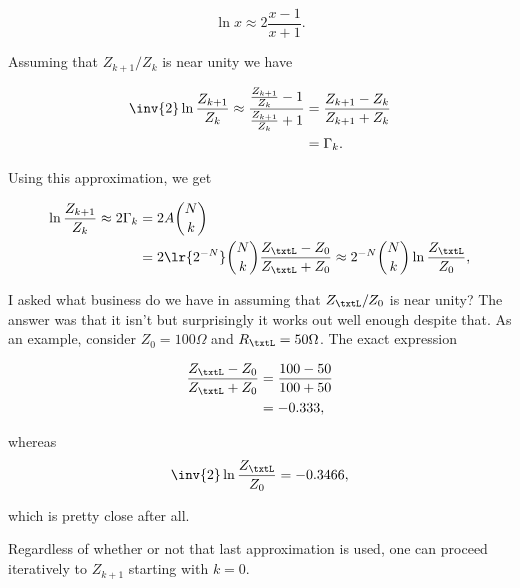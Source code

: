 \begin{equation}\label{eqn:uwavesDeck7MultisectionTransformersCore:340}
\ln x \approx 2 \frac{x -1}{x+1}.
\end{equation}

Assuming that \( Z_{k+1}/Z_k \) is near unity we have

\begin{equation}\label{eqn:uwavesDeck7MultisectionTransformersCore:360}
\begin{aligned}
\inv{2} \ln \frac{Z_{k+1}}{Z_k}
\approx
\frac{ \frac{Z_{k+1}}{Z_k} - 1 }{\frac{Z_{k+1}}{Z_k} + 1}
&=
\frac{ Z_{k+1} - Z_k }{Z_{k+1} + Z_k}
\\ &=
\Gamma_k.
\end{aligned}
\end{equation}

Using this approximation, we get

\begin{equation}\label{eqn:uwavesDeck7MultisectionTransformersCore:380}
\begin{aligned}
\ln \frac{Z_{k+1}}{Z_k}
\approx
2 \Gamma_k
&= 2 A \binom{N}{k}
\\ &= 2 \lr{2^{-N}} \binom{N}{k} \frac{Z_\txtL - Z_0}{Z_\txtL + Z_0}
\approx
2^{-N} \binom{N}{k} \ln \frac{Z_\txtL}{Z_0},
\end{aligned}
\end{equation}

I asked what business do we have in assuming that \( Z_\txtL/Z_0 \) is near unity?  The answer was that it isn't but surprisingly it works out well enough despite that.  As an example, consider \( Z_0 = 100 \Omega \) and \( R_\txtL = 50 \Omega \).  The exact expression

\begin{equation}\label{eqn:uwavesDeck7MultisectionTransformersCore:880}
\begin{aligned}
\frac{Z_\txtL - Z_0}{Z_\txtL + Z_0}
&= \frac{100-50}{100+50}
\\ &= -0.333,
\end{aligned}
\end{equation}

whereas
\begin{equation}\label{eqn:uwavesDeck7MultisectionTransformersCore:900}
\inv{2} \ln \frac{Z_\txtL}{Z_0} = -0.3466,
\end{equation}

which is pretty close after all.

Regardless of whether or not that last approximation is used, one can proceed iteratively to \( Z_{k+1} \) starting with \( k = 0 \).

